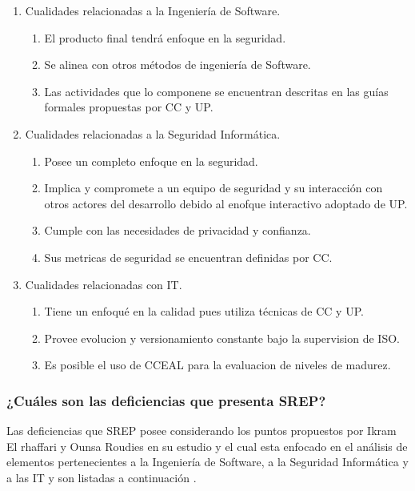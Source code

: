 \documentclass[runningheads,a4paper]{llncs}
\begin{document}
\begin{enumerate}
	\item Cualidades relacionadas a la Ingeniería de \gls{Software}.
		\begin{enumerate}
			\item El producto final tendrá enfoque en la seguridad.
			\item Se alinea con otros métodos de ingeniería de \gls{Software}.
			\item Las actividades que lo componene se encuentran descritas en las guías formales propuestas por \gls{CC} y \gls{UP}.\\
			
		\end{enumerate}
	\item Cualidades relacionadas a la Seguridad Informática.
		\begin{enumerate}
			\item Posee un completo enfoque en la seguridad.
			\item Implica y compromete a un equipo de seguridad y su interacción con otros actores del desarrollo debido al enofque interactivo adoptado de \gls{UP}.
			\item Cumple con las necesidades de privacidad y confianza.
			\item Sus metricas de seguridad se encuentran definidas por \gls{CC}.\\

		\end{enumerate}
	\item Cualidades relacionadas con \gls{IT}.
		\begin{enumerate}
			\item Tiene un enfoqué en la calidad pues utiliza técnicas de \gls{CC} y \gls{UP}. 
			\item Provee evolucion y versionamiento constante bajo la supervision de \gls{ISO}.
			\item Es posible el uso de \gls{CCEAL} para la evaluacion de niveles de madurez.
		\end{enumerate}
\end{enumerate}

\subsubsection{¿Cuáles son las deficiencias que presenta \gls{SREP}?}
Las deficiencias que \gls{SREP} posee considerando los puntos propuestos por Ikram El rhaffari y Ounsa Roudies en su estudio y el cual esta enfocado en el análisis de elementos pertenecientes a la Ingeniería de \gls{Software}, a la Seguridad Informática y a las \gls{IT} y son listadas a continuación \cite{BenchmarkingSDLCLAPS}.
\end{document}
